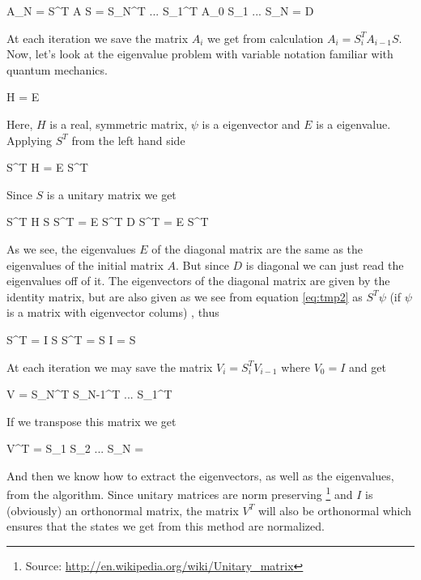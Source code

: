 \documentclass[a4paper,10pt,english]{article}
\numberwithin{figure}{subsection}
\numberwithin{table}{subsection}
\numberwithin{equation}{subsection}
\begin{document}
\eqs A_N = S^T A S = S_N^T ... S_1^T A_0 S_1 ... S_N = D \eqf

At each iteration we save the matrix $A_i$ we get from calculation $A_i = S_i^T A_{i-1} S$.
Now, let's look at the eigenvalue problem with variable notation familiar with quantum mechanics. 

\eqs H \psi = E \psi \eqf

Here, $H$ is a real, symmetric matrix, $\psi$ is a eigenvector and $E$ is a eigenvalue. 
Applying $S^T$ from the left hand side 

\eqs S^T H \psi = E S^T \psi \eqf

Since $S$ is a unitary matrix we get

\eqs S^T H S S^T \psi = E S^T \psi \eqf
\eqs D S^T \psi = E S^T \psi  \label{eq:tmp2}\eqf

As we see, the eigenvalues $E$ of the diagonal matrix are the same as the eigenvalues of 
the initial matrix $A$. 
But since $D$ is diagonal we can just read the eigenvalues off of it.
The eigenvectors of the diagonal matrix are given by the identity matrix, but 
are also given as we see from equation \ref{eq:tmp2} as $S^T \psi$
(if $\psi$ is a matrix with eigenvector colums)
, thus

\eqs S^T \psi = I \eqf
\eqs S S^T \psi = S I \eqf
\eqs \psi = S \eqf

At each iteration we may save the matrix $V_i = S_i^T V_{i-1}$ where $V_0 = I$ and get 

\eqs V = S_N^T S_{N-1}^T ... S_1^T \eqf

If we transpose this matrix we get


\eqs V^T  = S_1 S_2 ... S_N = \psi \eqf

And then we know how to extract the eigenvectors, as well as the eigenvalues, 
from the algorithm.  
Since unitary matrices are norm preserving 
\footnote{Source: \url{http://en.wikipedia.org/wiki/Unitary_matrix}}
and $I$ is (obviously) an orthonormal matrix, 
the matrix $V^T$ will also be orthonormal which ensures that the states we 
get from this method are normalized. 
\end{document}
